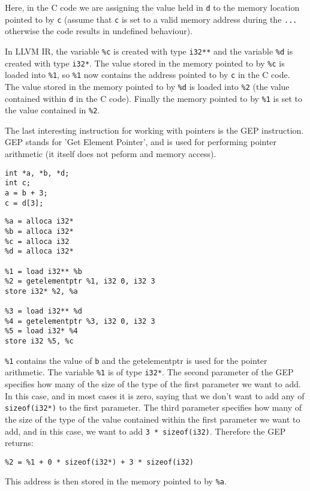 Here, in the C code we are assigning the value held in \verb!d! to the memory location pointed to by \verb!c! (assume that \verb!c! is set to a valid memory address during the \verb!...! otherwise the code results in undefined behaviour).

In LLVM IR, the variable \verb!%c! is created with type \verb!i32**! and the variable \verb!%d! is created with type \verb!i32*!.
The value stored in the memory pointed to by \verb!%c! is loaded into \verb!%1!, so \verb!%1! now contains the address pointed to by \verb!c! in the C code.
The value stored in the memory pointed to by \verb!%d! is loaded into \verb!%2! (the value contained within \verb!d! in the C code).
Finally the memory pointed to by \verb!%1! is set to the value contained in \verb!%2!.

The last interesting instruction for working with pointers is the GEP instruction.
GEP stands for 'Get Element Pointer', and is used for performing pointer arithmetic (it itself does not peform and memory access).

\begin{verbatim}
int *a, *b, *d;
int c;
a = b + 3;
c = d[3];
\end{verbatim}

\begin{verbatim}
%a = alloca i32*
%b = alloca i32*
%c = alloca i32
%d = alloca i32*

%1 = load i32** %b
%2 = getelementptr %1, i32 0, i32 3
store i32* %2, %a

%3 = load i32** %d
%4 = getelementptr %3, i32 0, i32 3
%5 = load i32* %4
store i32 %5, %c
\end{verbatim}

\verb!%1! contains the value of \verb!b! and the getelementptr is used for the pointer arithmetic.
The variable \verb!%1! is of type \verb!i32*!.
The second parameter of the GEP specifies how many of the size of the type of the first parameter we want to add.
In this case, and in most cases it is zero, saying that we don't want to add any of \verb!sizeof(i32*)! to the first parameter.
The third parameter specifies how many of the size of the type of the value contained within the first parameter we want to add, and in this case, we want to add \verb!3 * sizeof(i32)!.
Therefore the GEP returns:

\begin{verbatim}
%2 = %1 + 0 * sizeof(i32*) + 3 * sizeof(i32)
\end{verbatim}

This address is then stored in the memory pointed to by \verb!%a!.

